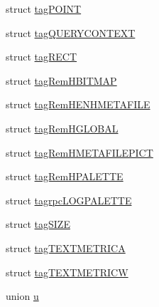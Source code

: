 \begin{DoxyCompactItemize}
\item 
struct \hyperlink{struct_i_win_types_1_1tag_p_o_i_n_t}{tag\+P\+O\+I\+NT}
\item 
struct \hyperlink{struct_i_win_types_1_1tag_q_u_e_r_y_c_o_n_t_e_x_t}{tag\+Q\+U\+E\+R\+Y\+C\+O\+N\+T\+E\+XT}
\item 
struct \hyperlink{struct_i_win_types_1_1tag_r_e_c_t}{tag\+R\+E\+CT}
\item 
struct \hyperlink{struct_i_win_types_1_1tag_rem_h_b_i_t_m_a_p}{tag\+Rem\+H\+B\+I\+T\+M\+AP}
\item 
struct \hyperlink{struct_i_win_types_1_1tag_rem_h_e_n_h_m_e_t_a_f_i_l_e}{tag\+Rem\+H\+E\+N\+H\+M\+E\+T\+A\+F\+I\+LE}
\item 
struct \hyperlink{struct_i_win_types_1_1tag_rem_h_g_l_o_b_a_l}{tag\+Rem\+H\+G\+L\+O\+B\+AL}
\item 
struct \hyperlink{struct_i_win_types_1_1tag_rem_h_m_e_t_a_f_i_l_e_p_i_c_t}{tag\+Rem\+H\+M\+E\+T\+A\+F\+I\+L\+E\+P\+I\+CT}
\item 
struct \hyperlink{struct_i_win_types_1_1tag_rem_h_p_a_l_e_t_t_e}{tag\+Rem\+H\+P\+A\+L\+E\+T\+TE}
\item 
struct \hyperlink{struct_i_win_types_1_1tagrpc_l_o_g_p_a_l_e_t_t_e}{tagrpc\+L\+O\+G\+P\+A\+L\+E\+T\+TE}
\item 
struct \hyperlink{struct_i_win_types_1_1tag_s_i_z_e}{tag\+S\+I\+ZE}
\item 
struct \hyperlink{struct_i_win_types_1_1tag_t_e_x_t_m_e_t_r_i_c_a}{tag\+T\+E\+X\+T\+M\+E\+T\+R\+I\+CA}
\item 
struct \hyperlink{struct_i_win_types_1_1tag_t_e_x_t_m_e_t_r_i_c_w}{tag\+T\+E\+X\+T\+M\+E\+T\+R\+I\+CW}
\item 
union \hyperlink{union_i_win_types_1_1u}{u}
\end{DoxyCompactItemize}
